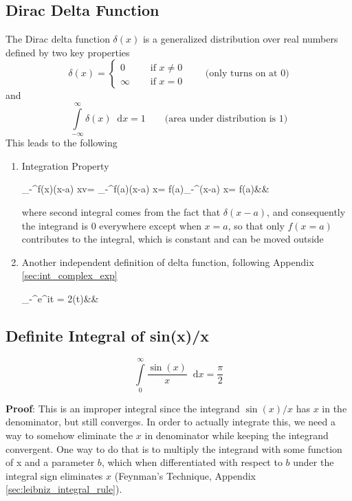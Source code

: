 \documentclass[11pt, a4paper]{article}
\newcommand{\diff}{\mathop{}\!\mathrm{d}}
\newcommand{\dx}{\diff x}
\newcommand{\domega}{\diff \omega}
\newcommand{\dint}[2]{\int \limits_{#1}^{#2}}  %
\newcommand{\intinfty}{\dint{-\infty}{\infty}}	%
\newcommand{\intzerotoinfty}{\dint{0}{\infty}}	%
\begin{document}
	\subsection{Dirac Delta Function}\label{sec:delta_func}
	The Dirac delta function $\delta(x)$ is a generalized distribution over real numbers defined by two key properties \cite{dirac1981qm}
	\begin{equation}\label{eq:delta_func_def}
		\delta (x) = \left\{
		\begin{array}{ll}
			0  &  \quad \text{ if } x \neq 0 \\
			\infty & \quad \text{ if } x = 0
		\end{array}
		\right. \qquad \text{(only turns on at $0$)}
	\end{equation}
	and
	\begin{equation}\label{eq:delta_func_area}
		\intinfty \delta (x) \dx = 1 \qquad \text{(area under distribution is $1$)}
	\end{equation}
	This leads to the following
	\begin{enumerate}
		\item Integration Property
		\begin{flalign}\label{eq:delta_func_integration_value}
			\intinfty f(x)\delta (x-a) \dx v= \intinfty f(a)\delta (x-a) \dx = f(a)\intinfty \delta (x-a) \dx = f(a)&&
		\end{flalign}
		where second integral comes from the fact that $\delta (x - a)$, and consequently the integrand is $0$ everywhere except when $x=a$, so that only $f(x=a)$ contributes to the integral, which is constant and can be moved outside
		\item Another independent definition of delta function, following Appendix \ref{sec:int_complex_exp}
		\begin{flalign}\label{eq:delta_func_def_complex_exp}
			\intinfty e^{i\omega t} \domega = 2\pi \delta (t)&&
		\end{flalign}
	\end{enumerate}
	
	\subsection{Definite Integral of sin(x)/x}\label{sec:int_sinx_by_x}
	\begin{equation}\label{eq:int_sinx_by_x}
		\intzerotoinfty \frac{\sin(x)}{x} \dx = \frac{\pi}{2}
	\end{equation}
	
	\vspace{4pt}
	\textbf{Proof}: \cite{herman2016fourieranalysis} This is an improper integral since the integrand $\sin(x) / x$ has $x$ in the denominator, but still converges. In order to actually integrate this, we need a way to somehow eliminate the $x$ in denominator while keeping the integrand convergent. One way to do that is to multiply the integrand with some function of x and a parameter $b$, which when differentiated with respect to $b$ under the integral sign eliminates $x$ (Feynman's Technique, Appendix \ref{sec:leibniz_integral_rule}).
	
\end{document}
